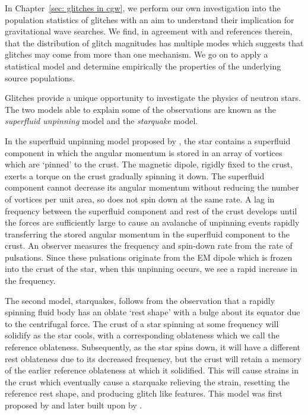 In Chapter~\ref{sec: glitches in cgw}, we perform our own investigation into the
population statistics of glitches with an aim to understand their implication
for gravitational wave searches. We find, in agreement with
\citet{Espinoza2011} and references therein, that the distribution of glitch
magnitudes has multiple modes which suggests that glitches may come from more
than one mechanism. We go on to apply a statistical model and determine empirically
the properties of the underlying source populations.


Glitches provide a unique opportunity to investigate the physics of neutron
stars. The two models able to explain some of the observations are known as the
\emph{superfluid unpinning} model and the \emph{starquake} model.

In the superfluid unpinning model proposed by \citet{Anderson1975}, the star
contains a superfluid component in which the angular momentum is stored in an
array of vortices which are `pinned' to the crust. The magnetic dipole, rigidly
fixed to the crust, exerts a torque on the crust gradually spinning it down.
The superfluid component cannot decrease its angular momentum without reducing
the number of vortices per unit area, so does not spin down at the same rate. A
lag in frequency between the superfluid component and rest of the crust
develops until the forces are sufficiently large to cause an avalanche of
unpinning events rapidly transferring the stored angular momentum in the
superfluid component to the crust. An observer measures the frequency and
spin-down rate from the rate of pulsations. Since these pulsations originate from the
EM dipole which is frozen into the crust of the star, when this unpinning
occurs, we see a rapid increase in the frequency.

The second model, starquakes, follows from the observation that a rapidly
spinning fluid body has an oblate `rest shape' with a bulge about its equator
due to the centrifugal force. The crust of a star spinning at some frequency
will solidify as the star cools, with a corresponding oblateness which we call
the reference oblateness. Subsequently, as the star spins down, it will have a
different rest oblateness due to its decreased frequency, but the crust will
retain a memory of the earlier reference oblateness at which it solidified.
This will cause strains in the crust which eventually cause a starquake
relieving the strain, resetting the reference rest shape, and producing glitch
like features. This model was first proposed by \citet{ruderman1969neutron} and later
built upon by \citet{Baym1971}.

